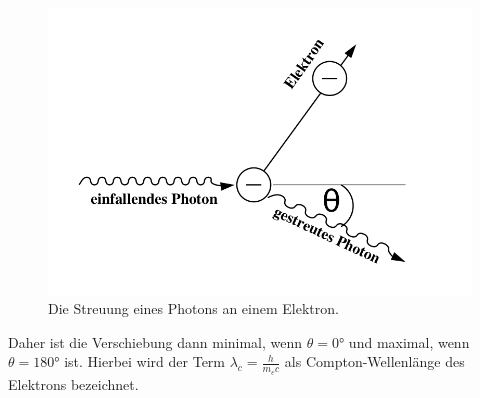 \begin{figure}[H]
	\centering
	\includegraphics[scale=0.3]{content/comptoneffekt.png}
	\caption{Die Streuung eines Photons an einem Elektron. \cite{AP01}}
	\label{fig:StreuungPhoton}
\end{figure}
\noindent
Daher ist die Verschiebung dann minimal, wenn $\theta = 0 \si{\degree}$ und maximal, wenn $\theta = 180 \si{\degree}$ ist.
Hierbei wird der Term $\lambda_c = \frac{h}{m_e c}$ als Compton-Wellenlänge des Elektrons bezeichnet.

